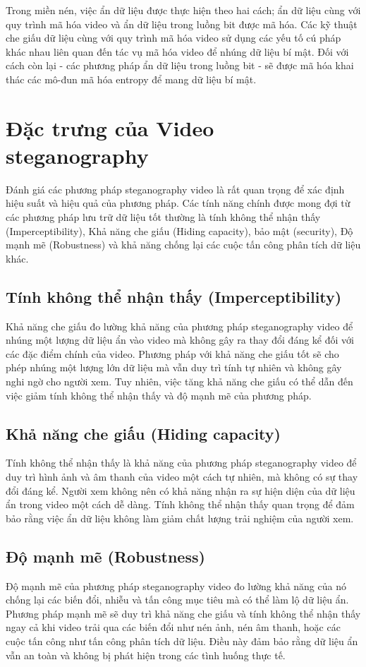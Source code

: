 Trong miền nén, việc ẩn dữ liệu được thực hiện theo hai cách; ẩn dữ liệu cùng với quy trình mã hóa video và ẩn dữ liệu trong luồng bit được mã hóa. Các kỹ thuật che giấu dữ liệu cùng với quy trình mã hóa video sử dụng các yếu tố cú pháp khác nhau liên quan đến tác vụ mã hóa video để nhúng dữ liệu bí mật. Đối với cách còn lại - các phương pháp ẩn dữ liệu trong luồng bit - sẽ được mã hóa khai thác các mô-đun mã hóa entropy để mang dữ liệu bí mật.

\section{Đặc trưng của Video steganography}
Đánh giá các phương pháp steganography video là rất quan trọng để xác định hiệu suất và hiệu quả của phương pháp. Các tính năng chính được mong đợi từ các phương pháp lưu trữ dữ liệu tốt thường là tính không thể nhận thấy (Imperceptibility), Khả năng che giấu (Hiding capacity), bảo mật (security), Độ mạnh mẽ (Robustness) và khả năng chống lại các cuộc tấn công phân tích dữ liệu khác.
\subsection{Tính không thể nhận thấy (Imperceptibility)}
Khả năng che giấu đo lường khả năng của phương pháp steganography video để nhúng một lượng dữ liệu ẩn vào video mà không gây ra thay đổi đáng kể đối với các đặc điểm chính của video. Phương pháp với khả năng che giấu tốt sẽ cho phép nhúng một lượng lớn dữ liệu mà vẫn duy trì tính tự nhiên và không gây nghi ngờ cho người xem. Tuy nhiên, việc tăng khả năng che giấu có thể dẫn đến việc giảm tính không thể nhận thấy và độ mạnh mẽ của phương pháp.
\subsection{Khả năng che giấu (Hiding capacity)}
Tính không thể nhận thấy là khả năng của phương pháp steganography video để duy trì hình ảnh và âm thanh của video một cách tự nhiên, mà không có sự thay đổi đáng kể. Người xem không nên có khả năng nhận ra sự hiện diện của dữ liệu ẩn trong video một cách dễ dàng. Tính không thể nhận thấy quan trọng để đảm bảo rằng việc ẩn dữ liệu không làm giảm chất lượng trải nghiệm của người xem.
\subsection{Độ mạnh mẽ (Robustness)}
Độ mạnh mẽ của phương pháp steganography video đo lường khả năng của nó chống lại các biến đổi, nhiễu và tấn công mục tiêu mà có thể làm lộ dữ liệu ẩn. Phương pháp mạnh mẽ sẽ duy trì khả năng che giấu và tính không thể nhận thấy ngay cả khi video trải qua các biến đổi như nén ảnh, nén âm thanh, hoặc các cuộc tấn công như tấn công phân tích dữ liệu. Điều này đảm bảo rằng dữ liệu ẩn vẫn an toàn và không bị phát hiện trong các tình huống thực tế.
